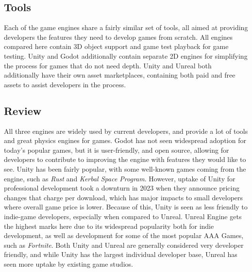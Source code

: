 \subsection{Tools}\label{sec:tools}

Each of the game engines share a fairly similar set of tools, all aimed at providing developers the features they need to develop games from scratch.
All engines compared here contain 3D object support and game test playback for game testing. Unity and Godot additionally contain separate 2D engines
for simplifying the process for games that do not need depth. Unity and Unreal both additionally have their own asset marketplaces, containing
both paid and free assets to assist developers in the process.

\subsection{Review}\label{sec:review}

All three engines are widely used by current developers, and provide a lot of tools and great physics engines for games. Godot has not seen
widespread adoption for today's popular games, but it is user-friendly, and open source, allowing for developers to contribute to improving
the engine with features they would like to see. Unity has been fairly popular, with some well-known games coming from the engine, such as \textit{Rust}
and \textit{Kerbal Space Program}. However, uptake of Unity for professional development took a downturn in 2023 when they announce pricing changes that
charge per download, which has major impacts to small developers where overall game price is lower. Because of this, Unity is seen as less
friendly to indie-game developers, especially when compared to Unreal. Unreal Engine gets the highest marks here due to its widespread popularity
both for indie development, as well as development for some of the most popular AAA Games, such as \textit{Fortnite}. Both Unity and Unreal are generally considered very
developer friendly, and while Unity has the largest individual developer base, Unreal has seen more uptake by existing game studios.
